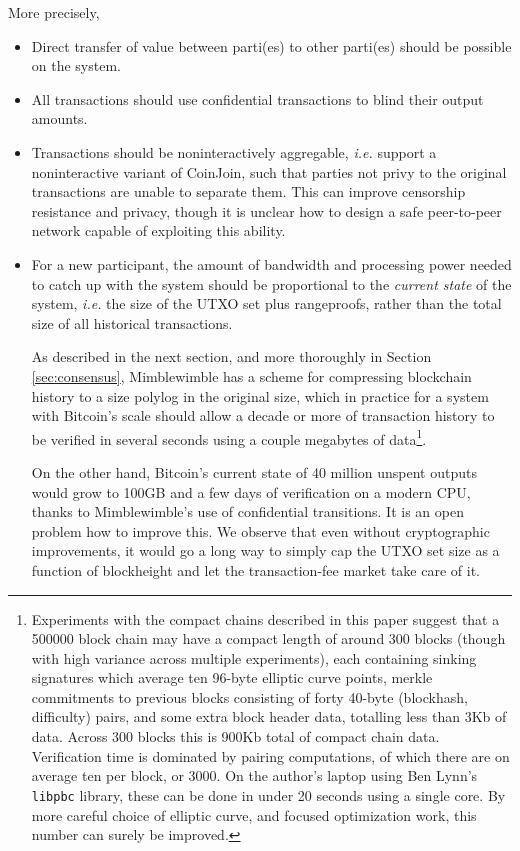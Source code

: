 \documentclass[letterpaper]{article}
\begin{document}
More precisely,
\begin{itemize}
\item Direct transfer of value between parti(es) to other parti(es)
should be possible on the system.

\item All transactions should use confidential transactions
to blind their output amounts.

\item Transactions should be noninteractively aggregable\cite{mouton2013},
\emph{i.e.} support a noninteractive variant of CoinJoin\cite{maxwell2013,maxwell2013-2},
such that parties not privy to the original transactions are unable to
separate them. This can improve censorship resistance and privacy,
though it is unclear how to design a safe peer-to-peer network capable
of exploiting this ability.

\item For a new participant, the amount of bandwidth and processing power
needed to catch up with the system should be proportional to the \emph{current
state} of the system, \emph{i.e.} the size of the UTXO set plus rangeproofs,
rather than the total size of all historical transactions.

As described in the next section, and more thoroughly in Section
\ref{sec:consensus}, Mimblewimble has a scheme for compressing blockchain
history to a size polylog in the original size, which in practice for a
system with Bitcoin's scale should allow a decade or more of transaction
history to be verified in several seconds using a couple megabytes of data\footnote{Experiments
with the compact chains described in this paper suggest that a 500000
block chain may have a compact length of around 300 blocks (though with
high variance across multiple experiments), each containing sinking
signatures which average ten 96-byte elliptic curve points, merkle
commitments to previous blocks consisting of forty 40-byte (blockhash,
difficulty) pairs, and some extra block header data, totalling less
than 3Kb of data. Across 300 blocks this is 900Kb total of compact
chain data. Verification time is dominated by pairing computations,
of which there are on average ten per block, or 3000. On the author's
laptop using Ben Lynn's \texttt{libpbc} library, these can be done
in under 20 seconds using a single core. By more careful choice of
elliptic curve, and focused optimization work, this number can surely
be improved.}.

On the other hand, Bitcoin's current state of 40 million unspent outputs
would grow to 100GB and a few days of verification on a modern CPU, thanks
to Mimblewimble's use of confidential transitions. It is an open problem
how to improve this. We observe that even without cryptographic improvements,
it would go a long way to simply cap the UTXO set size as a function of
blockheight and let the transaction-fee market take care of it.
\end{itemize}
\end{document}
